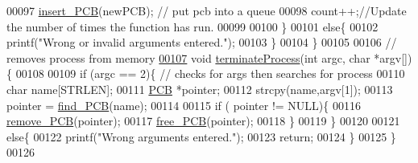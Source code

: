\begin{DoxyCode}
00097                 \hyperlink{mpx__r2_8c_aa3b334e3a5afd6e590917667ad359a6f}{insert_PCB}(newPCB);     \textcolor{comment}{// put pcb into a queue}
00098                 count++;\textcolor{comment}{//Update the number of times the function has run.}
00099                 
00100         \}
00101         \textcolor{keywordflow}{else}\{
00102                 printf(\textcolor{stringliteral}{"Wrong or invalid arguments entered."});
00103         \}
00104 \}
00105 
00106 \textcolor{comment}{// removes process from memory}
\hypertarget{mpx__r4_8c_source_l00107}{}\hyperlink{mpx__r4_8h_aaa714b85ce262f949d018430daf6da00}{00107} \textcolor{keywordtype}{void} \hyperlink{mpx__r4_8c_aaa714b85ce262f949d018430daf6da00}{terminateProcess}(\textcolor{keywordtype}{int} argc, \textcolor{keywordtype}{char} *argv[])\{
00108 
00109         \textcolor{keywordflow}{if} (argc == 2)\{ \textcolor{comment}{// checks for args then searches for process}
00110                 \textcolor{keywordtype}{char} name[STRLEN];
00111                 \hyperlink{structprocess}{PCB} *pointer;
00112                 strcpy(name,argv[1]);
00113                 pointer = \hyperlink{mpx__r2_8c_a612a6abcb66c688a32f33abc93ff3990}{find_PCB}(name);
00114         
00115                 \textcolor{keywordflow}{if} ( pointer != NULL)\{
00116                         \hyperlink{mpx__r2_8c_af30a3658210d449b4b53e5be2ed2bc2e}{remove_PCB}(pointer);
00117                         \hyperlink{mpx__r2_8c_a79890f055b1d0fccf1962bbde4877caa}{free_PCB}(pointer);
00118                 \}
00119         \}
00120         
00121         \textcolor{keywordflow}{else}\{
00122                 printf(\textcolor{stringliteral}{"Wrong arguments entered."});
00123                 \textcolor{keywordflow}{return};
00124         \}
00125 \}
00126 
\end{DoxyCode}
